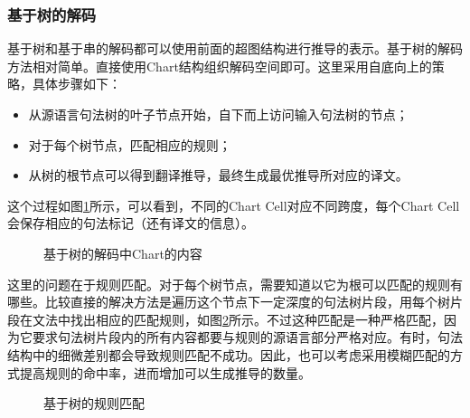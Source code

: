 
\subsubsection{基于树的解码}

\parinterval 基于树和基于串的解码都可以使用前面的超图结构进行推导的表示。基于树的解码方法相对简单。直接使用Chart结构组织解码空间即可。这里采用自底向上的策略，具体步骤如下：
\begin{itemize}
\vspace{0.5em}
\item 从源语言句法树的叶子节点开始，自下而上访问输入句法树的节点；
\vspace{0.5em}
\item 对于每个树节点，匹配相应的规则；
\vspace{0.5em}
\item 从树的根节点可以得到翻译推导，最终生成最优推导所对应的译文。
\vspace{0.5em}
\end{itemize}

\parinterval 这个过程如图\ref{fig:4-68}所示，可以看到，不同的Chart Cell对应不同跨度，每个Chart Cell会保存相应的句法标记（还有译文的信息）。

\begin{figure}[htp]
\centering

\caption{基于树的解码中Chart的内容}
\label{fig:4-68}
\end{figure}

\parinterval 这里的问题在于规则匹配。对于每个树节点，需要知道以它为根可以匹配的规则有哪些。比较直接的解决方法是遍历这个节点下一定深度的句法树片段，用每个树片段在文法中找出相应的匹配规则，如图\ref{fig:4-69}所示。不过这种匹配是一种严格匹配，因为它要求句法树片段内的所有内容都要与规则的源语言部分严格对应。有时，句法结构中的细微差别都会导致规则匹配不成功。因此，也可以考虑采用模糊匹配的方式提高规则的命中率，进而增加可以生成推导的数量\cite{zhu2011improving}。

\begin{figure}[htp]
\centering

\caption{基于树的规则匹配}
\label{fig:4-69}
\end{figure}

